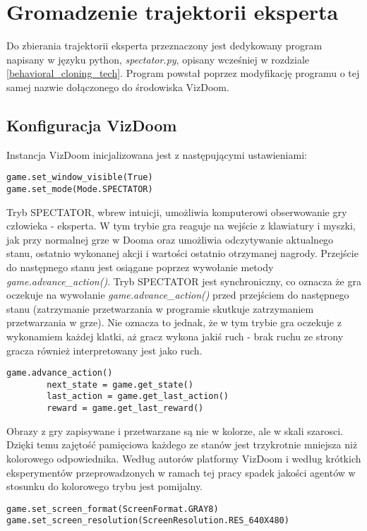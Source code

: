 \section{Gromadzenie trajektorii eksperta}

Do zbierania trajektorii eksperta przeznaczony jest dedykowany program napisany w języku python, \textit{spectator.py}, opisany wcześniej w rozdziale \ref{behavioral_cloning_tech}. Program powstał poprzez modyfikację programu o tej samej nazwie dołączonego do środowiska VizDoom.

\subsection{Konfiguracja VizDoom}
Instancja VizDoom inicjalizowana jest z następującymi ustawieniami:

\begin{lstlisting}[language=iPython]
game.set_window_visible(True)
game.set_mode(Mode.SPECTATOR)
\end{lstlisting}

Tryb SPECTATOR, wbrew intuicji, umożliwia komputerowi obserwowanie gry człowieka - eksperta. W tym trybie gra reaguje na wejście z klawiatury i myszki, jak przy normalnej grze w Dooma oraz umożliwia odczytywanie aktualnego stanu, ostatnio wykonanej akcji i wartości ostatnio otrzymanej nagrody. Przejście do następnego stanu jest osiągane poprzez wywołanie metody \textit{game.advance\_action()}. Tryb SPECTATOR jest synchroniczny, co oznacza że gra oczekuje na wywołanie \textit{game.advance\_action()} przed przejściem do następnego stanu (zatrzymanie przetwarzania w programie skutkuje zatrzymaniem przetwarzania w grze). Nie oznacza to jednak, że w tym trybie gra oczekuje z wykonamiem każdej klatki, aż gracz wykona jakiś ruch - brak ruchu ze strony gracza również interpretowany jest jako ruch.

\begin{lstlisting}[language=iPython]
 	game.advance_action()
        next_state = game.get_state()
        last_action = game.get_last_action()
        reward = game.get_last_reward()
\end{lstlisting}

Obrazy z gry zapisywane i przetwarzane są nie w kolorze, ale w skali szarosci. Dzięki temu zajętość pamięciowa każdego ze stanów jest trzykrotnie mniejsza niż kolorowego odpowiednika. Według autorów platformy VizDoom i według krótkich eksperymentów przeprowadzonych w ramach tej pracy spadek jakości agentów w stosunku do kolorowego trybu jest pomijalny.
\begin{lstlisting}[language=iPython]
game.set_screen_format(ScreenFormat.GRAY8)
game.set_screen_resolution(ScreenResolution.RES_640X480)
\end{lstlisting}

